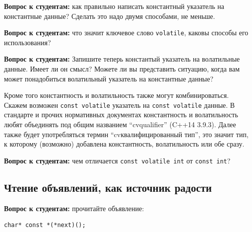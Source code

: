 \documentclass[a4paper,12pt,oneside]{book}
\newif\ifanswers
\begin{document}
\textbf{Вопрос к студентам:} как правильно написать константный указатель на константные данные? Сделать это надо двумя способами, не меньше.

\textbf{Вопрос к студентам:} что значит ключевое слово \lstinline!volatile!, каковы способы его использования?

\textbf{Вопрос к студентам:} Запишите теперь константый указатель на волатильные данные. Имеет ли он смысл? Можете ли вы представить ситуацию, когда вам может понадобиться волатильный указатель на константные данные?

\ifanswers
Ответы на первые два вопроса очевидны, но ответ на третий может быть несколько экзотичен: если этот указатель \lstinline!register! переменная, которая определяет область памяти откуда идёт чтение и которая при этом соответсвует не настоящему регистру а некоему устройству, притворяющемуся регистром, но допускающему смену состояний, то конструкция обретает смысл.
\fi

Кроме того константность и волатильность также могут комбинироваться. Скажем возможен \lstinline!const volatile! указатель на \lstinline!const volatile! данные. В стандарте и прочих нормативных документах константность и волатильность любят объединять под общим названием ``cv\-qualifier'' (C++14 3.9.3). Далее также будет употребляться термин ``cv\-квалифи\-цированный тип'', это значит тип, к которому (возможно) добавлена константность, волатильность или обе сразу.

\textbf{Вопрос к студентам:} чем отличается \lstinline!const volatile int! от \lstinline!const int!?

\ifanswers
Правильный ответ: константность означает, что оттуда можно только читать. При этом волатильность означает, что чтения оттуда нельзя переупорядочивать. Интересно, что здесь \lstinline!const! это по сути способ сказать \lstinline!readonly!, чем семантически выразить неизменность данных.
\fi

\subsection{Чтение объявлений, как источник радости}\label{AlgDecl}

\textbf{Вопрос к студентам:} прочитайте объявление:

\begin{lstlisting}
char* const *(*next)();
\end{lstlisting}
\end{document}
